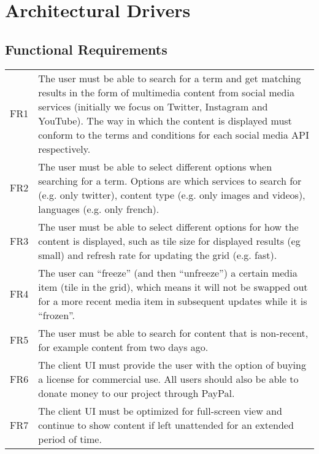 \label{ad}
\chapter{Architectural Drivers}

\section{Functional Requirements}
{\tabulinesep=1.4mm
\begin{tabu}{|l|l|}
\hline
{}
 \\
\hline
\taburowcolors{}
FR1 & \parbox[t]{105mm}{The user must be able to search for a term and get
   matching results in the form of multimedia content from social media services
   (initially we focus on Twitter, Instagram and YouTube). The way in which the
   content is displayed must conform to the terms and conditions for each social
   media API respectively.} \\
\hline
FR2 & \parbox[t]{105mm}{The user must be able to select different options when
   searching for a term. Options are which services to search for (e.g. only
   twitter), content type (e.g. only images and videos), languages (e.g. only
   french).} \\
\hline
FR3 & \parbox[t]{105mm}{The user must be able to select different options for
   how the content is displayed, such as tile size for displayed results
   (eg small) and refresh rate for updating the grid (e.g. fast).} \\
\hline
FR4 & \parbox[t]{105mm}{The user can ``freeze'' (and then ``unfreeze'') a
   certain media item (tile in the grid), which means it will not be swapped out
   for a more recent media item in subsequent updates while it is ``frozen''.}\\
\hline
FR5 & \parbox[t]{105mm}{The user must be able to search for content that is
   non-recent, for example content from two days ago.} \\
\hline
FR6 & \parbox[t]{105mm}{The client UI must provide the user with the option of
   buying a license for commercial use. All users should also be able to donate
   money to our project through PayPal.} \\
\hline
FR7 & \parbox[t]{105mm}{The client UI must be optimized for full-screen view and
   continue to show content if left unattended for an extended period of
   time.} \\
\hline
\end{tabu}} \\ \\
